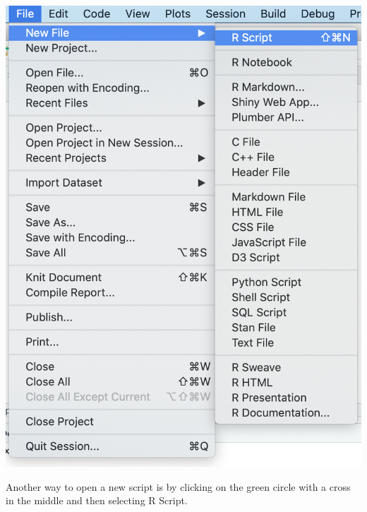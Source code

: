 \documentclass[
]{book}
\begin{document}
\includegraphics{img/NAVIGATING AND COMMANDS R16.png}

Another way to open a new script is by clicking on the green circle with a cross in the middle and then selecting R Script.
\end{document}
